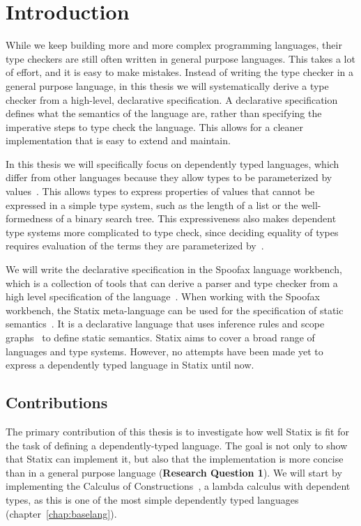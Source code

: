 \chapter{Introduction}

While we keep building more and more complex programming languages, their type checkers are still often written in general purpose languages. This takes a lot of effort, and it is easy to make mistakes. Instead of writing the type checker in a general purpose language, in this thesis we will systematically derive a type checker from a high-level, declarative specification. A declarative specification defines what the semantics of the language are, rather than specifying the imperative steps to type check the language. This allows for a cleaner implementation that is easy to extend and maintain. 

In this thesis we will specifically focus on dependently typed languages, which differ from other languages because they allow types to be parameterized by values~\cite{lambda_cube}. This allows types to express properties of values that cannot be expressed in a simple type system, such as the length of a list or the well-formedness of a binary search tree. This expressiveness also makes dependent type systems more complicated to type check, since deciding equality of types requires evaluation of the terms they are parameterized by~\cite{Coquand_Huet_1988}. 

We will write the declarative specification in the Spoofax language workbench, which is a collection of tools that can derive a parser and type checker from a high level specification of the language~\cite{spoofax}. When working with the Spoofax workbench, the Statix meta-language can be used for the specification of static semantics~\cite{scopes_as_types}. It is a declarative language that uses inference rules and scope graphs~\cite{scope_graphs} to define static semantics. Statix aims to cover a broad range of languages and type systems. However, no attempts have been made yet to express a dependently typed language in Statix until now.
 

\section*{Contributions}
The primary contribution of this thesis is to investigate how well Statix is fit for the task of defining a dependently-typed language. The goal is not only to show that Statix can implement it, but also that the implementation is more concise than in a general purpose language (\textbf{Research Question 1}). We will start by implementing the Calculus of Constructions~\cite{Coquand_Huet_1988}, a lambda calculus with dependent types, as this is one of the most simple dependently typed languages (chapter~\ref{chap:baselang}). 

